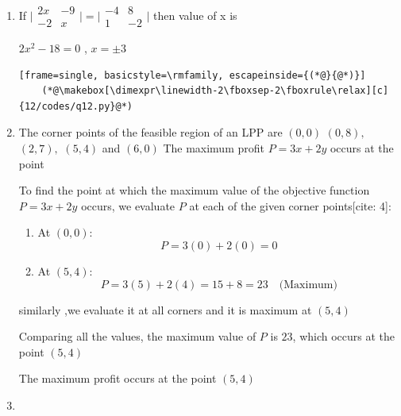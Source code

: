 \begin{enumerate}[label=\thesubsection.\arabic*, ref=\thesubsection.\theenumi]
\solution

$\frac{dr}{dt} =0.5 cm/s$ , circumference $c=2\pi r$

$\frac{dc}{dt}= 2\pi \frac{dr}{dt}$ , $\frac{dc}{dt} = \pi cm/s$

\item 

If $\vert{}\begin{matrix}2x&-9\\ -2&x\end{matrix}\vert{}=\vert{}\begin{matrix}-4&8\\ 1&-2\end{matrix}\vert{}$ then value of x is   

\solution

$2x^2 - 18 =0$ , $x=\pm 3$

\begin{lstlisting}[frame=single, basicstyle=\rmfamily, escapeinside={(*@}{@*)}]
	(*@\makebox[\dimexpr\linewidth-2\fboxsep-2\fboxrule\relax][c]{12/codes/q12.py}@*)
\end{lstlisting}
\item 

The corner points of the feasible region of an LPP are $(0,0)$ $(0,8),$ $(2,7),$ $(5,4)$ and $(6,0)$ The maximum profit $P=3x+2y$ occurs at the point 

\solution

To find the point at which the maximum value of the objective function $P = 3x + 2y$ occurs, we evaluate $P$ at each of the given corner points[cite: 4]:

\begin{enumerate}
    \item At $(0,0)$:
    $$P = 3(0) + 2(0) = 0$$

   

    \item At $(5,4)$:
    $$P = 3(5) + 2(4) = 15 + 8 = 23 \quad \text{(Maximum)}$$

    
\end{enumerate}

similarly ,we evaluate it at all corners and it is maximum at $(5,4)$ 

Comparing all the values, the maximum value of $P$ is $23$, which occurs at the point $(5,4)$



The maximum profit occurs at the point $(5,4)$

\item 


\end{enumerate}
